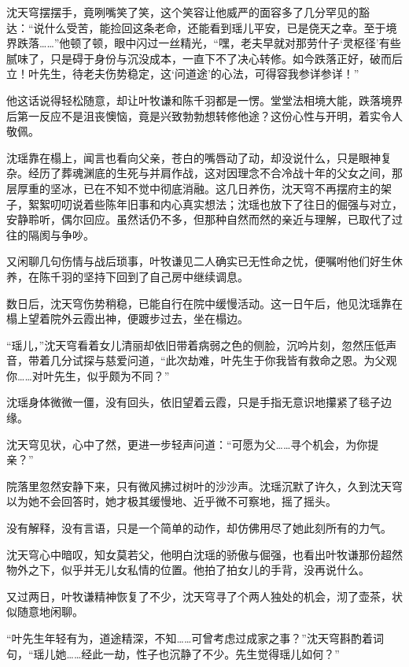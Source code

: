 沈天穹摆摆手，竟咧嘴笑了笑，这个笑容让他威严的面容多了几分罕见的豁达：“说什么受苦，能捡回这条老命，还能看到瑶儿平安，已是侥天之幸。至于境界跌落……”他顿了顿，眼中闪过一丝精光，“嘿，老夫早就对那劳什子‘灵枢径’有些腻味了，只是碍于身份与沉没成本，一直下不了决心转修。如今跌落正好，破而后立！叶先生，待老夫伤势稳定，这‘问道途’的心法，可得容我参详参详！”

他这话说得轻松随意，却让叶牧谦和陈千羽都是一愣。堂堂法相境大能，跌落境界后第一反应不是沮丧懊恼，竟是兴致勃勃想转修他途？这份心性与开明，着实令人敬佩。

沈瑶靠在榻上，闻言也看向父亲，苍白的嘴唇动了动，却没说什么，只是眼神复杂。经历了葬魂渊底的生死与并肩作战，这对因理念不合冷战十年的父女之间，那层厚重的坚冰，已在不知不觉中彻底消融。这几日养伤，沈天穹不再摆府主的架子，絮絮叨叨说着些陈年旧事和内心真实想法；沈瑶也放下了往日的倔强与对立，安静聆听，偶尔回应。虽然话仍不多，但那种自然而然的亲近与理解，已取代了过往的隔阂与争吵。

又闲聊几句伤情与战后琐事，叶牧谦见二人确实已无性命之忧，便嘱咐他们好生休养，在陈千羽的坚持下回到了自己房中继续调息。

\vspace{2em}

数日后，沈天穹伤势稍稳，已能自行在院中缓慢活动。这一日午后，他见沈瑶靠在榻上望着院外云霞出神，便踱步过去，坐在榻边。

“瑶儿，”沈天穹看着女儿清丽却依旧带着病弱之色的侧脸，沉吟片刻，忽然压低声音，带着几分试探与慈爱问道，“此次劫难，叶先生于你我皆有救命之恩。为父观你……对叶先生，似乎颇为不同？”

沈瑶身体微微一僵，没有回头，依旧望着云霞，只是手指无意识地攥紧了毯子边缘。

沈天穹见状，心中了然，更进一步轻声问道：“可愿为父……寻个机会，为你提亲？”

院落里忽然安静下来，只有微风拂过树叶的沙沙声。沈瑶沉默了许久，久到沈天穹以为她不会回答时，她才极其缓慢地、近乎微不可察地，摇了摇头。

没有解释，没有言语，只是一个简单的动作，却仿佛用尽了她此刻所有的力气。

沈天穹心中暗叹，知女莫若父，他明白沈瑶的骄傲与倔强，也看出叶牧谦那份超然物外之下，似乎并无儿女私情的位置。他拍了拍女儿的手背，没再说什么。

又过两日，叶牧谦精神恢复了不少，沈天穹寻了个两人独处的机会，沏了壶茶，状似随意地闲聊。

“叶先生年轻有为，道途精深，不知……可曾考虑过成家之事？”沈天穹斟酌着词句，“瑶儿她……经此一劫，性子也沉静了不少。先生觉得瑶儿如何？”

